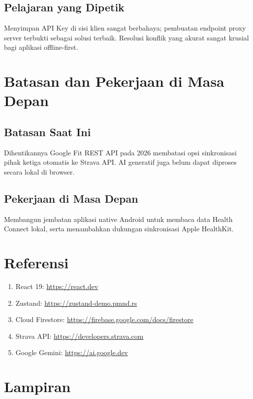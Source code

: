 \documentclass[12pt,a4paper]{article}
\begin{document}
\subsection{Pelajaran yang Dipetik}
Menyimpan API Key di sisi klien sangat berbahaya; pembuatan endpoint proxy server terbukti sebagai solusi terbaik. Resolusi konflik yang akurat sangat krusial bagi aplikasi offline-first.

\section{Batasan dan Pekerjaan di Masa Depan}

\subsection{Batasan Saat Ini}
Dihentikannya Google Fit REST API pada 2026 membatasi opsi sinkronisasi pihak ketiga otomatis ke Strava API. AI generatif juga belum dapat diproses secara lokal di browser.

\subsection{Pekerjaan di Masa Depan}
Membangun jembatan aplikasi native Android untuk membaca data Health Connect lokal, serta menambahkan dukungan sinkronisasi Apple HealthKit.

\section{Referensi}
\begin{enumerate}
    \item React 19: \href{https://react.dev}{https://react.dev}
    \item Zustand: \href{https://zustand-demo.pmnd.rs}{https://zustand-demo.pmnd.rs}
    \item Cloud Firestore: \href{https://firebase.google.com/docs/firestore}{https://firebase.google.com/docs/firestore}
    \item Strava API: \href{https://developers.strava.com}{https://developers.strava.com}
    \item Google Gemini: \href{https://ai.google.dev}{https://ai.google.dev}
\end{enumerate}

\newpage
\section{Lampiran}
\end{document}
